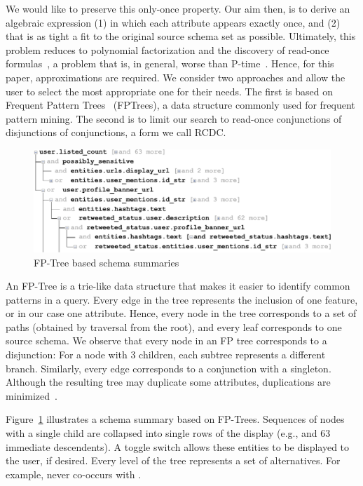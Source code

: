 We would like to preserve this only-once property.
Our aim then, is to derive an algebraic expression (1) in which each attribute appears exactly once, and (2) that is as tight a fit to the original source schema set as possible.
Ultimately, this problem reduces to polynomial factorization and the discovery of read-once formulas~\cite{Dalvi:2013:DPI:2395116.2395119}, a problem that is, in general, worse than P-time~\cite{DBLP:conf/focs/Burgisser01}.
Hence, for this paper, approximations are required.
We consider two approaches and allow the user to select the most appropriate one for their needs.
The first is based on Frequent Pattern Trees~\cite{DBLP:conf/sigmod/HanPY00} (FPTrees), a data structure commonly used for frequent pattern mining.
The second is to limit our search to read-once conjunctions of disjunctions of conjunctions, a form we call RCDC.

\begin{figure}
\centering
\includegraphics[width=\columnwidth]{SchemaSummarization/img/collapse-FPTree}
\caption{FP-Tree based schema summaries}
\label{fig:summary:fptree}
\end{figure}

An FP-Tree is a trie-like data structure that makes it easier to identify common patterns in a query.  
Every edge in the tree represents the inclusion of one feature, or in our case one attribute.
Hence, every node in the tree corresponds to a set of paths (obtained by traversal from the root), and every leaf corresponds to one source schema.
We observe that every node in an FP tree corresponds to a disjunction: For a node with 3 children, each subtree represents a different branch.  
Similarly, every edge corresponds to a conjunction with a singleton.
Although the resulting tree may duplicate some attributes, duplications are minimized~\cite{DBLP:conf/sigmod/HanPY00}.

\begin{example}
Figure~\ref{fig:summary:fptree} illustrates a schema summary based on  FP-Trees.  
Sequences of nodes with a single child are collapsed into single rows of the display (e.g.,  and 63 immediate descendents).
A toggle switch allows these entities to be displayed to the user, if desired.
Every level of the tree represents a set of alternatives. For example,  never co-occurs with .  
\end{example}

